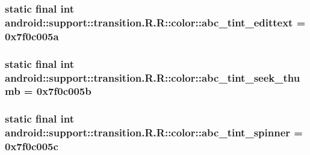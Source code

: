 \hypertarget{classandroid_1_1support_1_1transition_1_1_r_1_1color_78632e0f9866d92a6d800979a442ceb4}{
\subsubsection[{abc\_\-tint\_\-edittext}]{\setlength{\rightskip}{0pt plus 5cm}static final int android::support::transition.R.R::color::abc\_\-tint\_\-edittext = 0x7f0c005a}}
\label{classandroid_1_1support_1_1transition_1_1_r_1_1color_78632e0f9866d92a6d800979a442ceb4}


\hypertarget{classandroid_1_1support_1_1transition_1_1_r_1_1color_0b477495be5874188f9fe1ca585b0b3e}{
\subsubsection[{abc\_\-tint\_\-seek\_\-thumb}]{\setlength{\rightskip}{0pt plus 5cm}static final int android::support::transition.R.R::color::abc\_\-tint\_\-seek\_\-thumb = 0x7f0c005b}}
\label{classandroid_1_1support_1_1transition_1_1_r_1_1color_0b477495be5874188f9fe1ca585b0b3e}


\hypertarget{classandroid_1_1support_1_1transition_1_1_r_1_1color_11501b14595e2944376fb3bbf691ddef}{
\subsubsection[{abc\_\-tint\_\-spinner}]{\setlength{\rightskip}{0pt plus 5cm}static final int android::support::transition.R.R::color::abc\_\-tint\_\-spinner = 0x7f0c005c}}
\label{classandroid_1_1support_1_1transition_1_1_r_1_1color_11501b14595e2944376fb3bbf691ddef}


